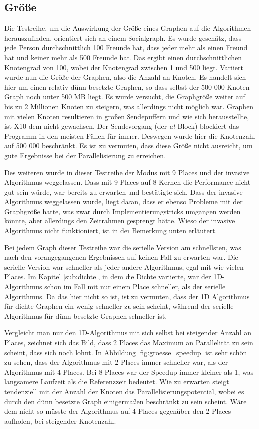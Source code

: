 \subsection{Größe} %
\label{sub:gr_e}
Die Testreihe, um die Auswirkung der Größe eines Graphen auf die Algorithmen herauszufinden, orientiert sich an einem Socialgraph. Es wurde geschätz, dass jede Person durchschnittlich 100 Freunde hat, dass jeder mehr als einen Freund hat und keiner mehr als 500 Freunde hat. Das ergibt einen durchschnittlichen Knotengrad von 100, wobei der Knotengrad zwischen 1 und 500 liegt. Variiert wurde nun die Größe der Graphen, also die Anzahl an Knoten. Es handelt sich hier um einen relativ dünn besetzte Graphen, so dass selbst der 500 000 Knoten Graph noch unter 500 MB liegt. Es wurde versucht, die Graphgröße weiter auf bis zu 2 Millionen Knoten zu steigern, was allerdings nicht möglich war. Graphen mit vielen Knoten resultieren in großen Sendepuffern und wie sich herausstellte, ist X10 dem nicht gewachsen. Der Sendevorgang (der \textit{at} Block) blockiert das Programm in den meisten Fällen für immer. Deswegen wurde hier die Knotenzahl auf 500 000 beschränkt. Es ist zu vermuten, dass diese Größe nicht ausreicht, um gute Ergebnisse bei der Parallelisierung zu erreichen.

Des weiteren wurde in dieser Testreihe der Modus mit 9 Places und der invasive Algorithmus weggelassen. Dass mit 9 Places auf 8 Kernen die Performance nicht gut sein würde, war bereits zu erwarten und bestätigte sich. Dass der invasive Algorithmus weggelassen wurde, liegt daran, dass er ebenso Probleme mit der Graphgröße hatte, was zwar durch Implementierungstricks umgangen werden könnte, aber allerdings den Zeitrahmen gesprengt hätte. Wieso der invasive Algorithmus nicht funktioniert, ist in der Bemerkung unten erläutert.

Bei jedem Graph dieser Testreihe war die serielle Version am schnellsten, was nach den vorangegangenen Ergebnissen auf keinen Fall zu erwarten war. Die serielle Version war schneller als jeder andere Algorithmus, egal mit wie vielen Places. Im Kapitel \ref{sub:dichte}, in dem die Dichte variierte, war der 1D-Algorithmus schon im Fall mit nur einem Place schneller, als der serielle Algorithmus. Da das hier nicht so ist, ist zu vermuten, dass der 1D Algorithmus für dichte Graphen ein wenig schneller zu sein scheint, während der serielle Algorithmus für dünn besetzte Graphen schneller ist.

Vergleicht man nur den 1D-Algorithmus mit sich selbst bei steigender Anzahl an Places, zeichnet sich das Bild, dass 2 Places das Maximum an Parallelität zu sein scheint, dass sich noch lohnt. In Abbildung \ref{fig:groesse_speedup} ist sehr schön zu sehen, dass der Algorithmus mit 2 Places immer schneller war, als der Algorithmus mit 4 Places. Bei 8 Places war der Speedup immer kleiner als 1, was langsamere Laufzeit als die Referenzzeit bedeutet. Wie zu erwarten steigt tendenziell mit der Anzahl der Knoten das Parallelisierungspotential, wobei es durch den dünn besetzte Graph einigermaßen beschränkt zu sein scheint. Wäre dem nicht so müsste der Algorithmus auf 4 Places gegenüber den 2 Places aufholen, bei steigender Knotenzahl.

